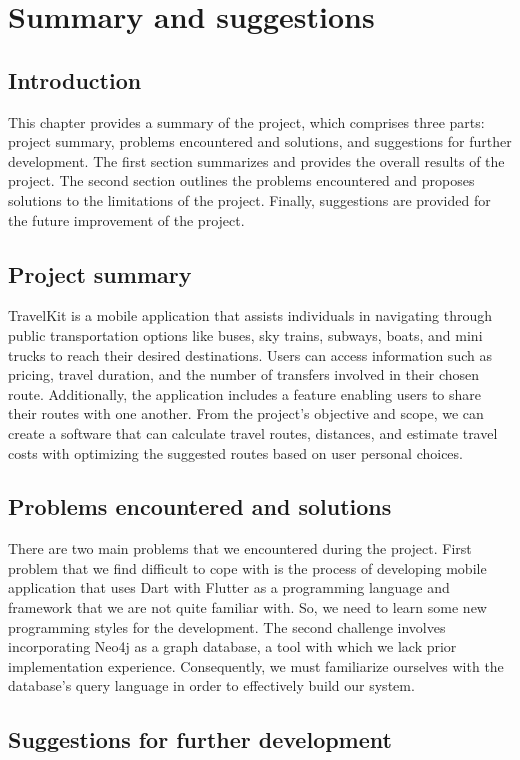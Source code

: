 \chapter{Summary and suggestions}
\section{Introduction}
This chapter provides a summary of the project, which comprises three parts: project summary, problems encountered and solutions, and suggestions for further development. The first section summarizes and provides the overall results of the project. The second section outlines the problems encountered and proposes solutions to the limitations of the project. Finally, suggestions are provided for the future improvement of the project.

\section{Project summary}
TravelKit is a mobile application that assists individuals in navigating through public transportation options like buses, sky trains, subways, boats, and mini trucks to reach their desired destinations. Users can access information such as pricing, travel duration, and the number of transfers involved in their chosen route. Additionally, the application includes a feature enabling users to share their routes with one another. From the project’s objective and scope, we can create a software that can calculate travel routes, distances, and estimate travel costs with optimizing the suggested routes based on user personal choices.

\section{Problems encountered and solutions}
There are two main problems that we encountered during the project. First problem that we find difficult to cope with is the process of developing mobile application that uses Dart with Flutter as a programming language and framework that we are not quite familiar with. So, we need to learn some new programming styles for the development. The second challenge involves incorporating Neo4j as a graph database, a tool with which we lack prior implementation experience. Consequently, we must familiarize ourselves with the database's query language in order to effectively build our system.

\newpage
\section{Suggestions for further development}
